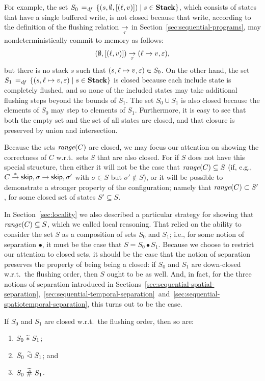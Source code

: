 \documentclass[11pt]{report}
\begin{document}
For example, the set $S_0 \operatorname{\;=_{\mathit{df}}\;} \left\lbrace (s,\operatorname{\emptyset},\left[(\ell,v)\right]) \mid s \in \mathbf{Stack} \right\rbrace$, which consists of states that have a single buffered write, is not closed because that write, according to the definition of the flushing relation $\underset{\tau}{\rightarrow}$ in Section~\ref{sec:sequential-programs}, may nondeterministically commit to memory as follows: \[(\operatorname{\emptyset},\left[(\ell,v)\right]) \underset{\tau}{\rightarrow} (\ell \mapsto v,\varepsilon),\] but there is no stack $s$ such that $(s, \ell \mapsto v, \varepsilon) \in S_0$. On the other hand, the set $S_1 \operatorname{\;=_{\mathit{df}}\;} \left\lbrace (s,\ell \mapsto v,\varepsilon) \mid s \in \mathbf{Stack} \right\rbrace$ is closed because each include state is completely flushed, and so none of the included states may take additional flushing steps beyond the bounds of $S_1$. The set $S_0 \cup S_1$ is also closed because the elements of $S_0$ may step to elements of $S_1$. Furthermore, it is easy to see that both the empty set and the set of all states are closed, and that closure is preserved by union and intersection. 

Because the sets $\mathit{range}(C)$ are closed, we may focus our attention on showing the correctness of $C$ w.r.t.\ sets $S$ that are also closed. For if $S$ does not have this special structure, then either it will not be the case that $\mathit{range}(C) \subseteq S$ (if, e.g., $C \stackrel{\ast}{\rightarrow} \operatorname{\mathsf{skip}},\sigma \rightarrow \operatorname{\mathsf{skip}},\sigma'$ with $\sigma \in S$ but $\sigma' \notin S$), or it will be possible to demonstrate a stronger property of the configuration; namely that $\mathit{range}(C) \subset S'$, for some closed set of states $S' \subseteq S$. 

In Section~\ref{sec:locality} we also described a particular strategy for showing that $\mathit{range}(C) \subseteq S$, which we called local reasoning. That relied on the ability to consider the set $S$ as a composition of sets $S_0$ and $S_1$; i.e., for some notion of separation $\bullet$, it must be the case that $S = S_0 \bullet S_1$. Because we choose to restrict our attention to closed sets, it should be the case that the notion of separation preserves the property of being being a closed: if $S_0$ and $S_1$ are down-closed w.r.t.\ the flushing order, then $S$ ought to be as well. And, in fact, for the three notions of separation introduced in Sections~\ref{sec:sequential-spatial-separation},~\ref{sec:sequential-temporal-separation}~and~\ref{sec:sequential-spatiotemporal-separation}, this turns out to be the case. 
\begin{lemma}
    \label{lem:separation-preserves-closure}    
    If $S_0$ and $S_1$ are closed w.r.t.\ the flushing order, then so are: 
    \begin{enumerate}
        \item $S_0 \operatorname{\,\widetilde{\ast}\,} S_1$; 
        \item $S_0 \operatorname{\,\widetilde{\vartriangleleft}\,} S_1$; and 
        \item $S_0 \operatorname{\,\widetilde{\#}\,} S_1$.
    \end{enumerate}
\end{lemma}
\end{document}
